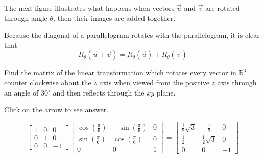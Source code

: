 \documentclass{ximera}
\begin{document}
\begin{problem}
\begin{hint}
The next figure  illustrates what happens when vectors $\vec{u}$ and $\vec{v}$ are rotated through angle $\theta$, then their images are added together.  

\begin{center}
  \end{center}
  
  
  Because the diagonal of a parallelogram rotates with the parallelogram, it is clear that 
$$R_{\theta}(\vec{u}+\vec{v})=R_{\theta}(\vec{u})+R_{\theta}(\vec{v})$$
\end{hint}
\end{problem}

\begin{problem}\label{prb:6.25} Find the matrix of the linear transformation which rotates every
vector in $\mathbb{R}^{3}$ counter clockwise about the $z$ axis when viewed
from the positive $z$ axis through an angle of 30$^{\circ }$ and then
reflects through the $xy$ plane.

Click on the arrow to see answer.
\begin{expandable}{}{}
\[
\left[
\begin{array}{rrr}
1 & 0 & 0 \\
0 & 1 & 0 \\
0 & 0 & -1
\end{array}
\right] \left[
\begin{array}{ccc}
\cos \left( \frac{\pi }{6}\right)  & -\sin \left( \frac{\pi }{6}\right)  & 0
\\
\sin \left( \frac{\pi }{6}\right)  & \cos \left( \frac{\pi }{6}\right)  & 0
\\
0 & 0 & 1
\end{array}
\right] = \left[
\begin{array}{ccc}
\frac{1}{2}\sqrt{3} & -\frac{1}{2} & 0 \\
\frac{1}{2} & \frac{1}{2}\sqrt{3} & 0 \\
0 & 0 & -1
\end{array}
\right]
\]
\end{expandable}
\end{problem}
\end{document}
